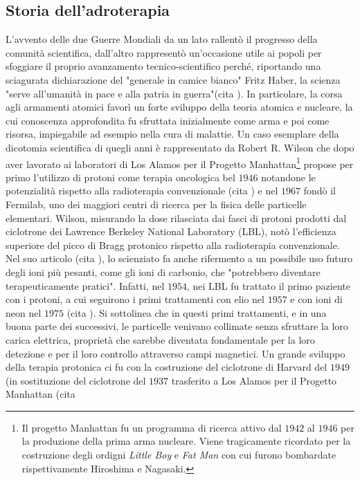 \documentclass[12pt,a4paper,twoside]{report}
\begin{document}
	\subsection{Storia dell'adroterapia}\label{storia_adroterapia}
	
	L'avvento delle due Guerre Mondiali da un lato rallentò il progresso della comunità scientifica, dall'altro rappresentò un'occasione utile ai popoli per sfoggiare il proprio avanzamento tecnico-scientifico perché, riportando una sciagurata dichiarazione del "generale in camice bianco" Fritz Haber, la scienza "serve all’umanità in pace e alla patria in guerra"(cita
	). In particolare, la corsa agli armamenti atomici favorì un forte sviluppo della teoria atomica e nucleare, la cui conoscenza approfondita fu sfruttata inizialmente come arma e poi come risorsa, impiegabile ad esempio nella cura di malattie. Un caso esemplare della dicotomia scientifica di quegli anni è rappresentato da Robert R. Wilson che dopo aver lavorato ai laboratori di Los Alamos per il Progetto Manhattan\footnote{Il progetto Manhattan fu un programma di ricerca attivo dal $1942$ al $1946$ per la produzione della prima arma nucleare. Viene tragicamente ricordato per la costruzione degli ordigni \textit{Little Boy} e \textit{Fat Man} con cui furono bombardate rispettivamente Hiroshima e Nagasaki.} propose per primo l'utilizzo di protoni come terapia oncologica bel $1946$ notandone le potenzialità rispetto alla radioterapia convenzionale (cita
	) e nel $1967$ fondò il Fermilab, uno dei maggiori centri di ricerca per la fisica delle particelle elementari. Wilson, misurando la dose rilasciata dai fasci di protoni prodotti dal ciclotrone dei Lawrence Berkeley National Laboratory (LBL), notò l'efficienza superiore del picco di Bragg protonico rispetto alla radioterapia convenzionale. Nel suo articolo (cita
	), lo scienziato fa anche rifermento a un possibile uso futuro degli ioni più pesanti, come gli ioni di carbonio, che "potrebbero diventare terapeuticamente pratici". Infatti, nel $1954$, nei LBL fu trattato il primo paziente con i protoni, a cui seguirono i primi trattamenti con elio nel $1957$ e con ioni di neon nel $1975$ (cita
	). Si sottolinea che in questi primi trattamenti, e in una buona parte dei successivi, le particelle venivano collimate senza sfruttare la loro carica elettrica, proprietà che sarebbe diventata fondamentale per la loro detezione e per il loro controllo attraverso campi magnetici. Un grande sviluppo della terapia protonica ci fu con la costruzione del ciclotrone di Harvard del $1949$ (in sostituzione del ciclotrone del $1937$ trasferito a Los Alamos per il Progetto Manhattan (cita
\end{document}
